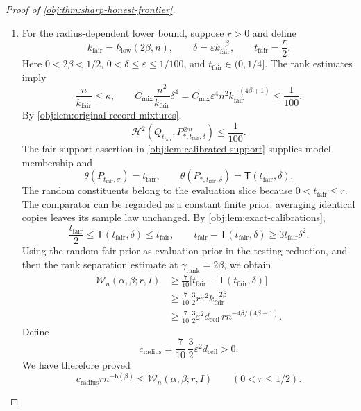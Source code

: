 \begin{proof}[Proof of \cref{obj:thm:sharp-honest-frontier}]
\begin{enumerate}
\item For the radius-dependent lower bound, suppose \(r>0\) and define
\[
k_{\mathrm{fair}}=k_{\mathrm{low}}(2\beta,n),
\qquad
\delta=\varepsilon k_{\mathrm{fair}}^{-\beta},
\qquad
t_{\mathrm{fair}}=\frac r2.
\]
Here \(0<2\beta<1/2\), \(0<\delta\le\varepsilon\le1/100\), and
\(t_{\mathrm{fair}}\in(0,1/4]\). The rank estimates imply
\[
\frac{n}{k_{\mathrm{fair}}}\le\kappa,
\qquad
C_{\mathrm{mix}}\frac{n^2}{k_{\mathrm{fair}}}\delta^4
=
C_{\mathrm{mix}}\varepsilon^4
n^2k_{\mathrm{fair}}^{-(4\beta+1)}
\le\frac1{100}.
\]
By \cref{obj:lem:original-record-mixtures},
\[
\mathcal H^2\!\left(
Q_{t_{\mathrm{fair}}},
P_{*,t_{\mathrm{fair}},\delta}^{\otimes n}
\right)\le\frac1{100}.
\]
The fair support assertion in \cref{obj:lem:calibrated-support} supplies
model membership and
\[
\theta(P_{t_{\mathrm{fair}},\sigma})=t_{\mathrm{fair}},
\qquad
\theta(P_{*,t_{\mathrm{fair}},\delta})
=\mathsf T(t_{\mathrm{fair}},\delta).
\]
The random constituents belong to the evaluation slice because
\(0<t_{\mathrm{fair}}\le r\). The comparator can be regarded as a constant
finite prior: averaging identical copies leaves its sample law unchanged.
By \cref{obj:lem:exact-calibrations},
\[
\frac{t_{\mathrm{fair}}}{2}
\le\mathsf T(t_{\mathrm{fair}},\delta)\le t_{\mathrm{fair}},
\qquad
t_{\mathrm{fair}}-\mathsf T(t_{\mathrm{fair}},\delta)
\ge3t_{\mathrm{fair}}\delta^2.
\]
Using the random fair prior as evaluation prior in the testing reduction,
and then the rank separation estimate at \(\gamma_{\mathrm{rank}}=2\beta\),
we obtain
\[
\begin{aligned}
\mathcal W_n(\alpha,\beta;r,I)
&\ge
\frac7{10}
\bigl[t_{\mathrm{fair}}-\mathsf T(t_{\mathrm{fair}},\delta)\bigr]\\
&\ge
\frac7{10}\,\frac32 r\varepsilon^2k_{\mathrm{fair}}^{-2\beta}\\
&\ge
\frac7{10}\,\frac32\varepsilon^2d_{\mathrm{ceil}}\,
r n^{-4\beta/(4\beta+1)}.
\end{aligned}
\]
Define
\[
c_{\mathrm{radius}}
=\frac7{10}\,\frac32\varepsilon^2d_{\mathrm{ceil}}>0.
\]
We have therefore proved
\[
c_{\mathrm{radius}}r n^{-\mathsf b(\beta)}
\le\mathcal W_n(\alpha,\beta;r,I)
\qquad(0<r\le1/2).
\]


\end{enumerate}
\end{proof}
